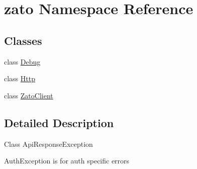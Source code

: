 \hypertarget{namespacezato}{}\section{zato Namespace Reference}
\label{namespacezato}
\subsection*{Classes}
\begin{DoxyCompactItemize}
\item 
class \hyperlink{classzato_1_1_debug}{Debug}
\item 
class \hyperlink{classzato_1_1_http}{Http}
\item 
class \hyperlink{classzato_1_1_zato_client}{Zato\+Client}
\end{DoxyCompactItemize}


\subsection{Detailed Description}
Class Api\+Response\+Exception

Auth\+Exception is for auth specific errors  